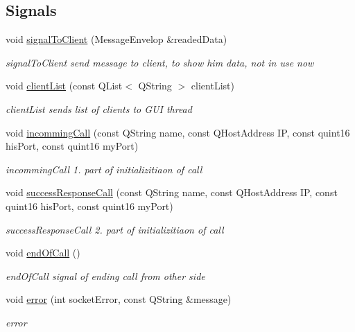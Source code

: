 \subsection*{Signals}
\begin{DoxyCompactItemize}
\item 
void \hyperlink{classPenguinClient_1_1ClientServerThread_a43213b711e120e2e84c82c8e35480c5f}{signal\-To\-Client} (Message\-Envelop \&readed\-Data)
\begin{DoxyCompactList}\small\item\em signal\-To\-Client send message to client, to show him data, not in use now \end{DoxyCompactList}\item 
void \hyperlink{classPenguinClient_1_1ClientServerThread_afe6e7353d83b7abaeed8a5cd3d6d308b}{client\-List} (const Q\-List$<$ Q\-String $>$ client\-List)
\begin{DoxyCompactList}\small\item\em client\-List sends list of clients to G\-U\-I thread \end{DoxyCompactList}\item 
void \hyperlink{classPenguinClient_1_1ClientServerThread_ad9243936519761c34857b7be3e13305d}{incomming\-Call} (const Q\-String name, const Q\-Host\-Address I\-P, const quint16 his\-Port, const quint16 my\-Port)
\begin{DoxyCompactList}\small\item\em incomming\-Call 1. part of initializitiaon of call \end{DoxyCompactList}\item 
void \hyperlink{classPenguinClient_1_1ClientServerThread_a82b4668ed1c995b0e6c82ef0e1970630}{success\-Response\-Call} (const Q\-String name, const Q\-Host\-Address I\-P, const quint16 his\-Port, const quint16 my\-Port)
\begin{DoxyCompactList}\small\item\em success\-Response\-Call 2. part of initializitiaon of call \end{DoxyCompactList}\item 
\hypertarget{classPenguinClient_1_1ClientServerThread_acb0bacb6fc830edb2ea2d7e1a33b7256}{void \hyperlink{classPenguinClient_1_1ClientServerThread_acb0bacb6fc830edb2ea2d7e1a33b7256}{end\-Of\-Call} ()}\label{classPenguinClient_1_1ClientServerThread_acb0bacb6fc830edb2ea2d7e1a33b7256}

\begin{DoxyCompactList}\small\item\em end\-Of\-Call signal of ending call from other side \end{DoxyCompactList}\item 
void \hyperlink{classPenguinClient_1_1ClientServerThread_a9946be2e2851f3e87a17fbaa6da55c4f}{error} (int socket\-Error, const Q\-String \&message)
\begin{DoxyCompactList}\small\item\em error \end{DoxyCompactList}\end{DoxyCompactItemize}
